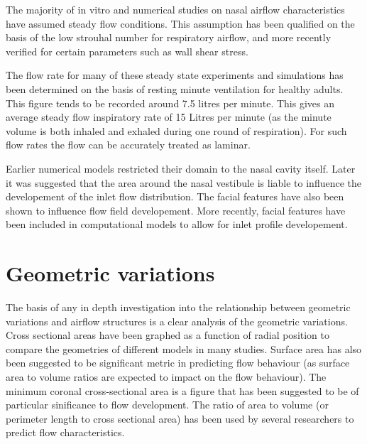 The majority of in vitro and numerical studies on nasal airflow characteristics have assumed steady flow conditions\cite{Doorly2008c, Keyhani1995, Subramaniam1998, Wen2008}. This assumption has been qualified on the basis of the low strouhal number for respiratory airflow\cite{Keyhani1995}, and more recently verified for certain parameters such as wall shear stress\cite{Doorly2008c}.

The flow rate for many of these steady state experiments and simulations has been determined on the basis of resting minute ventilation for healthy adults\cite{Subramaniam1998, Wen2008}. This figure tends to be recorded around 7.5 litres per minute\cite{Chaya2006, Tobin1983}. This gives an average steady flow inspiratory rate of 15 Litres per minute (as the minute volume is both inhaled and exhaled during one round of respiration)\cite{Subramaniam1998}. For such flow rates the flow can be accurately treated as laminar\cite{Doorly2008c, Hahn1993}.

Earlier numerical models restricted their domain to the nasal cavity itself\cite{Keyhani1995, Subramaniam1998, Wen2008}. Later it was suggested that the area around the nasal vestibule is liable to influence the developement of the inlet flow distribution\cite{Doorly2008}. The facial features have also been shown to influence flow field developement\cite{Anthony2005}. More recently, facial features have been included in computational models to allow for inlet profile developement\cite{Li2012, Lee2010}.

\section{Geometric variations}
The basis of any in depth investigation into the relationship between geometric variations and airflow structures is a clear analysis of the geometric variations. Cross sectional areas have been graphed as a function of radial position to compare the geometries of different models in many studies\cite{Xi2012, Zhu2011, Lindemann2008, Garcia2007}. Surface area has also been suggested to be significant metric in predicting flow behaviour (as surface area to volume ratios are expected to impact on the flow behaviour\cite{Xi2012, Garcia2007}). The minimum coronal cross-sectional area is a figure that has been suggested to be of particular sinificance to flow development\cite{Lindemann2008}. The ratio of area to volume (or perimeter length to cross sectional area) has been used by several researchers to predict flow characteristics\cite{Xi2012, Garcia2007}.

